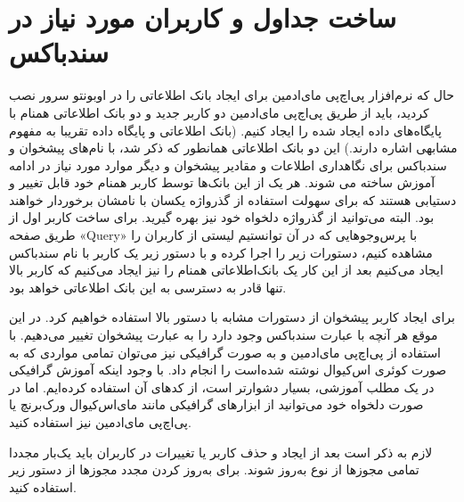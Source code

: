 \section{ساخت جداول و کاربران مورد نیاز در سندباکس}
حال که نرم‌افزار پی‌اچ‌پی مای‌ادمین برای ایجاد بانک اطلاعاتی را در اوبونتو سرور نصب کردید، باید از طریق پی‌اچ‌پی مای‌ادمین دو کاربر جدید و دو بانک اطلاعاتی همنام با پایگاه‌های داده ایجاد شده را ایجاد کنیم. (بانک اطلاعاتی و پایگاه داده تقریبا به مفهوم مشابهی اشاره دارند.) این دو بانک اطلاعاتی همانطور که ذکر شد، با نام‌های پیشخوان و سندباکس برای نگاهداری اطلاعات و مقادیر پیشخوان و دیگر موارد مورد نیاز در ادامه آموزش ساخته می شوند. هر یک از این بانک‌ها توسط کاربر همنام خود قابل تغییر و دستیابی هستند که برای سهولت استفاده از گذرواژه یکسان با نامشان برخوردار خواهند بود. البته می‌توانید از گذرواژه دلخواه خود نیز بهره گیرید. برای ساخت کاربر اول از طریق صفحه «Query» با پرس‌وجوهایی که در آن توانستیم لیستی از کاربران را مشاهده کنیم، دستورات زیر را اجرا کرده و با دستور زیر یک کاربر با نام سندباکس ایجاد می‌کنیم بعد از این کار یک بانک‌اطلاعاتی همنام را نیز ایجاد می‌کنیم که کاربر بالا تنها قادر به دسترسی به این بانک اطلاعاتی خواهد بود.
\newline
\begin{latin}  
    
\end{latin}

برای ایجاد کاربر پیشخوان از دستورات مشابه با دستور بالا استفاده خواهیم کرد. در این موقع هر آنچه با عبارت سندباکس وجود دارد را به عبارت پیشخوان تغییر می‌دهیم. با استفاده از پی‌اچ‌پی مای‌ادمین و به صورت گرافیکی نیز می‌توان تمامی مواردی که به صورت کوئری اس‌کیوال نوشته شده‌است را انجام داد. با وجود اینکه آموزش گرافیکی در یک مطلب آموزشی، بسیار دشوارتر است، از کدهای آن استفاده کرده‌ایم. اما در صورت دلخواه خود می‌توانید از ابزارهای گرافیکی مانند مای‌اس‌کیوال ورک‌‌برنچ یا پی‌اچ‌پی مای‌ادمین نیز استفاده کنید.
\newline

\begin{latin}  
    
\end{latin}

لازم به ذکر است بعد از ایجاد و حذف کاربر یا تغییرات در کاربران باید  یک‌بار مجددا تمامی مجوزها از نوع به‌روز شوند. برای به‌روز کردن مجدد مجوزها از دستور زیر استفاده کنید.
\newline

